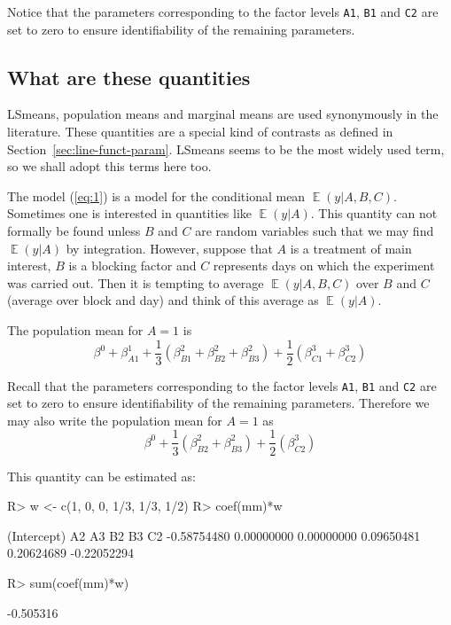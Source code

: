 \documentclass[11pt]{article}
\DeclareMathOperator{\EE}{\mathbb{E}}
\def\code#1{\texttt{#1}}
\begin{document}
Notice that the parameters corresponding to the factor levels
\code{A1}, \code{B1} and \code{C2} are set to zero to ensure
identifiability of the remaining parameters.

\subsection{What are these quantities}
\label{sec:what-are-these}

LSmeans, population means and marginal means are used synonymously in
the literature. 
These quantities are a special kind of contrasts as defined in
Section~\ref{sec:line-funct-param}.
LSmeans seems to be the most widely used term, so we
shall adopt this terms here too.

The model (\ref{eq:1})
is a model for the conditional mean $\EE(y|A,B,C)$.  Sometimes one is
interested in quantities like $\EE(y|A)$. This quantity can not
formally be found unless $B$ and $C$ are random variables such that we
may find $\EE(y|A)$ by integration.
However, suppose that $A$ is a treatment of main interest, $B$ is a
blocking factor and $C$ represents days on which the experiment was
carried out. Then it is tempting to average $\EE(y|A,B,C)$ over $B$
and $C$ (average over block and day) and think of this average as
$\EE(y|A)$.


The population mean for $A=1$ is
\begin{equation}
  \label{eq:2}
  \beta^0 + \beta^1_{A1} + \frac{1}{3} (\beta^2_{B1}+\beta^2_{B2}+\beta^2_{B3})
  + \frac{1}{2}(\beta^3_{C1}+\beta^3_{C2})
\end{equation}

Recall that the
parameters corresponding to the factor levels
\code{A1}, \code{B1} and \code{C2} are set to zero to ensure
identifiability of the remaining parameters. Therefore we may also
write the population mean for $A=1$ as
\begin{equation}
  \label{eq:3}
  \beta^0 + \frac{1}{3} (\beta^2_{B2}+\beta^2_{B3})
  + \frac{1}{2}(\beta^3_{C2})
\end{equation}


This quantity can be estimated as:

\begin{Schunk}
\begin{Sinput}
R> w <- c(1, 0, 0, 1/3, 1/3, 1/2)
R> coef(mm)*w
\end{Sinput}
\begin{Soutput}
(Intercept)          A2          A3          B2          B3          C2 
-0.58754480  0.00000000  0.00000000  0.09650481  0.20624689 -0.22052294 
\end{Soutput}
\begin{Sinput}
R> sum(coef(mm)*w)
\end{Sinput}
\begin{Soutput}
[1] -0.505316
\end{Soutput}
\end{Schunk}
\end{document}
